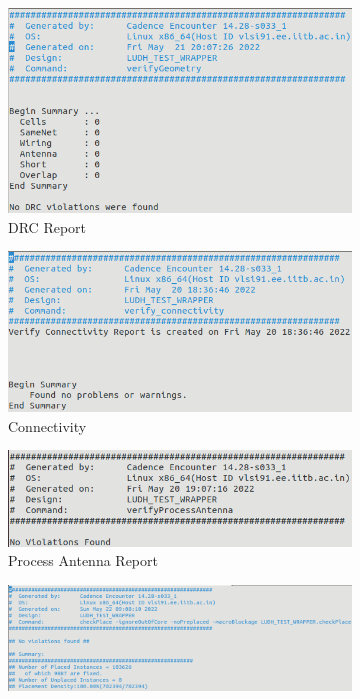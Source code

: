 \begin{figure}
  \begin{subfigure}{.5\textwidth}
    \centering
    \includegraphics[width=.9\linewidth]{./ASIC/DRC.png}
    \caption{DRC Report}
    \end{subfigure}%
    \begin{subfigure}{.5\textwidth}
    \centering
    \includegraphics[width=.9\linewidth]{./ASIC/Connectivity.png}
    \caption{Connectivity}
    \end{subfigure}
    \begin{subfigure}{.5\textwidth}
      \centering
      \includegraphics[width=.9\linewidth]{./ASIC/ProcessAntenna.png}
      \caption{Process Antenna Report}
      \end{subfigure}
      \begin{subfigure}{.5\textwidth}
        \centering
        \includegraphics[width=.9\linewidth]{./ASIC/Placement.png}

\end{subfigure}
\end{figure}
